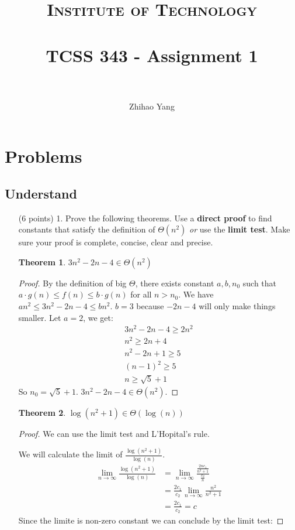 \documentclass[paper=a4, fontsize=11pt]{scrartcl}
\title{
		\usefont{OT1}{bch}{b}{n}
		\normalfont \normalsize \textsc{Institute of Technology} \\ [25pt]
		\horrule{0.5pt} \\[0.4cm]
		\huge TCSS 343 - Assignment 1\\
		\horrule{2pt} \\[0.5cm]
}
\author{
		\normalfont 								\normalsize
        Zhihao Yang\\[-3pt]
}
\newtheorem{theorem}{Theorem}
\numberwithin{equation}{section}		%
\numberwithin{figure}{section}			%
\numberwithin{table}{section}				%
\begin{document}
\maketitle

\newpage
\section{Problems}

\subsection{Understand}

\begin{enumerate}
\item [(6 points) 1.] Prove the following theorems.  Use a \textbf{direct proof} to find constants that satisfy the definition of $\Theta(n^2)$ \textit{or} use the \textbf{limit test}.  Make sure your proof is complete, concise, clear and precise.

\begin{theorem}
$3n^2 - 2n - 4 \in \Theta(n^2)$
\end{theorem}
	\begin{proof}
		By the definition of big $\Theta$, there exists constant $a, b, n_0$ such that $a\cdot g(n) \leq f(n)\leq b\cdot g(n)$ for all $n>n_0$. We have $an^2 \leq 3n^2 - 2n - 4 \leq bn^2$. $b=3$ because $-2n-4$ will only make things smaller. Let $a = 2$, we get:
		\begin{align*}
			3n^2-2n-4 \geq 2n^2 \\
			n^2 \geq 2n+4 \\
			n^2 - 2n + 1 \geq 5 \\
			(n-1)^2 \geq 5 \\
			n \geq \sqrt{5} + 1
		\end{align*}
		So $n_0 = \sqrt{5} + 1$. $3n^2 - 2n - 4 \in \Theta(n^2)$.
	\end{proof}
\begin{theorem}
$\log(n^2 + 1) \in \Theta(\log(n))$
\end{theorem}
	\begin{proof}
		We can use the limit test and L'Hopital's rule. 
		
		We will calculate the limit of $\frac{\log(n^2+1)}{\log(n)}$. 
		\begin{align*}
			\lim_{n\rightarrow\infty} \frac{\log(n^2+1)}{\log(n)} &= \lim_{n\rightarrow\infty} \frac{\frac{2nc_1}{n^2+1}}{\frac{c_2}{n}} \\
			&= 	\frac{2c_1}{c_2}\lim_{n\rightarrow\infty} \frac{n^2}{n^2+1} \\
			&= \frac{2c_1}{c_2} = c
		\end{align*}
		Since the limite is non-zero constant we can conclude by the limit test:
		

\end{proof}
\end{enumerate}
\end{document}
